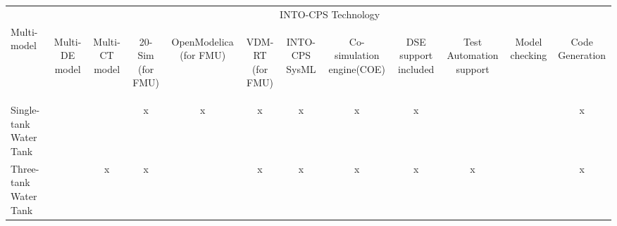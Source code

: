 \begin{table}[ht]
\begin{centering}
\begin{tabular}{|l|c|c|c|c|c|c|c|c|c|c|c|}\hline
  &\multicolumn{11}{c|}{INTO-CPS Technology} \\
\cline{2-12}
Multi-model
&\begin{sideways}Multi-DE model\end{sideways}
&\begin{sideways}Multi-CT model\end{sideways}
&\begin{sideways}20-Sim (for FMU)\end{sideways}
&\begin{sideways}OpenModelica (for FMU)\end{sideways}
&\begin{sideways}VDM-RT (for FMU)\end{sideways}
&\begin{sideways}INTO-CPS SysML\end{sideways}  
&\begin{sideways}Co-simulation engine(COE)\end{sideways}
&\begin{sideways}DSE support included\end{sideways}
&\begin{sideways}{Test Automation support}\end{sideways}
&\begin{sideways}{Model checking}\end{sideways}
&\begin{sideways}{Code Generation}\end{sideways} \\
\hline
Single-tank Water Tank	& & &x&x&x&x&x&x& & &x\\ \hline
Three-tank Water Tank	& &x&x& &x&x&x&x&x& &x\\ \hline

\end{tabular}
\end{centering}
\end{table}
